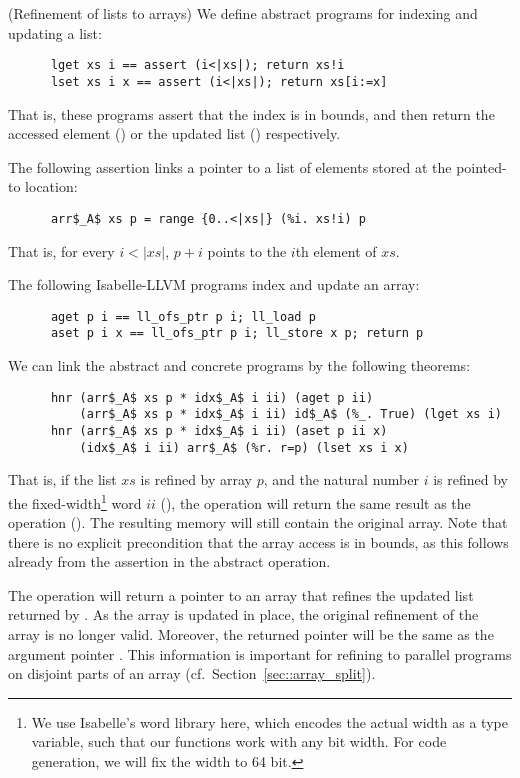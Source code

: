 \documentclass[runningheads]{llncs}
\begin{document}
  \begin{example}(Refinement of lists to arrays)\label{ex:ref_array}
    We define abstract programs for indexing and updating a list:
    \begin{lstlisting}
      lget xs i == assert (i<|xs|); return xs!i
      lset xs i x == assert (i<|xs|); return xs[i:=x]
    \end{lstlisting}
    That is, these programs assert that the index is in bounds, and then return the accessed element ()
    or the updated list () respectively.

    The following assertion links a pointer to a list of elements stored at the pointed-to location:
    \begin{lstlisting}
      arr$_A$ xs p = range {0..<|xs|} (%i. xs!i) p
    \end{lstlisting}
    That is, for every $i<|xs|$, $p+i$ points to the $i$th element of $xs$.

    The following Isabelle-LLVM programs index and update an array:
    \begin{lstlisting}
      aget p i == ll_ofs_ptr p i; ll_load p
      aset p i x == ll_ofs_ptr p i; ll_store x p; return p
    \end{lstlisting}

    We can link the abstract and concrete programs by the following theorems:
    \begin{lstlisting}
      hnr (arr$_A$ xs p * idx$_A$ i ii) (aget p ii)
          (arr$_A$ xs p * idx$_A$ i ii) id$_A$ (%_. True) (lget xs i)
      hnr (arr$_A$ xs p * idx$_A$ i ii) (aset p ii x)
          (idx$_A$ i ii) arr$_A$ (%r. r=p) (lset xs i x)
    \end{lstlisting}
    That is, if the list $xs$ is refined by array $p$, and the natural number $i$ is refined
    by the fixed-width\footnote{We use Isabelle's word library here, which encodes the actual width as a type variable,
    such that our functions work with any bit width. For code generation, we will fix the width to 64 bit.} word $ii$ (),
    the  operation will return the same result as the  operation ().
    The resulting memory will still contain the original array. Note that there is no explicit precondition that the array access
    is in bounds, as this follows already from the assertion in the abstract  operation.

    The  operation will return a pointer to an array that refines the updated list returned by .
    As the array is updated in place, the original refinement of the array is no longer valid.
    Moreover, the returned pointer  will be the same as the argument pointer .
    This information is important for refining to parallel programs on disjoint parts of an
    array (cf.\ Section~\ref{sec::array_split}).


  \end{example}
\end{document}
